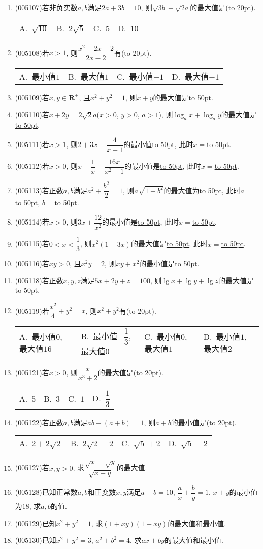 \documentclass[10pt,a4paper]{article}
\newcommand{\blank}[1]{\underline{\hbox to #1pt{}}}
\newcommand{\bracket}[1]{(\hbox to #1pt{})}
\newcommand{\fourch}[4]{\par\begin{tabular}{p{.23\textwidth}p{.23\textwidth}p{.23\textwidth}p{.23\textwidth}}
A.~#1 &B.~#2& C.~#3& D.~#4
\end{tabular}}
\begin{document}
\begin{enumerate}[1.]
\item {\tiny (005107)}若非负实数$a,b$满足$2a+3b=10$, 则$\sqrt{3b}+\sqrt{2a}$的最大值是\bracket{20}.
\fourch{$\sqrt{10}$}{$2\sqrt 5$}{$5$}{$10$}
\item {\tiny (005108)}若$x>1$, 则$\dfrac{x^2-2x+2}{2x-2}$有\bracket{20}.
\fourch{最小值$1$}{最大值$1$}{最小值$-1$}{最大值$-1$}
\item {\tiny (005109)}若$x,y\in \mathbf{R}^+$, 且$x^2+y^2=1$, 则$x+y$的最大值是\blank{50}.
\item {\tiny (005110)}若$x+2y=2\sqrt 2a$($x>0$, $y>0$, $a>1$), 则$\log_ax+\log_ay$的最大值是\blank{50}.
\item {\tiny (005111)}若$x>1$, 则$2+3x+\dfrac 4{x-1}$的最小值\blank{50}, 此时$x=$\blank{50}.
\item {\tiny (005112)}若$x>0$, 则$x+\dfrac 1x+\dfrac{16x}{x^2+1}$的最小值是\blank{50}, 此时$x=$\blank{50}.
\item {\tiny (005113)}若正数$a,b$满足$a^2+\dfrac{b^2}2=1$, 则$a\sqrt{1+b^2}$的最大值为\blank{50}, 此时$a=$\blank{50}, $b=$\blank{50}.
\item {\tiny (005114)}若$x>0$, 则$3x+\dfrac{12}{x^2}$的最小值是\blank{50}, 此时$x=$\blank{50}.
\item {\tiny (005115)}若$0<x<\dfrac 13$, 则$x^2(1-3x)$的最大值是\blank{50}, 此时$x=$\blank{50}.
\item {\tiny (005116)}若$xy>0$, 且$x^2y=2$, 则$xy+x^2$的最小值是\blank{50}.
\item {\tiny (005118)}若正数$x,y,z$满足$5x+2y+z=100$, 则$\lg x+\lg y+\lg z$的最大值是\blank{50}.
\item {\tiny (005119)}若$\dfrac{x^2}4+{y^2}=x$, 则$x^2+y^2$有\bracket{20}.
\fourch{最小值$0$, 最大值$16$}{最小值$-\dfrac 13$, 最大值$0$}{最小值$0$, 最大值$1$}{最小值$1$, 最大值$2$}
\item {\tiny (005121)}若$x>0$, 则$\dfrac x{x^3+2}$的最大值是\bracket{20}.
\fourch{$5$}{$3$}{$1$}{$\dfrac 13$}
\item {\tiny (005122)}若正数$a,b$满足$ab-(a+b)=1$, 则$a+b$的最小值是\bracket{20}.
\fourch{$2+2\sqrt 2$}{$2\sqrt 2-2$}{$\sqrt 5+2$}{$\sqrt 5-2$}
\item {\tiny (005127)}若$x,y>0$, 求$\dfrac{\sqrt x+\sqrt y}{\sqrt{x+y}}$的最大值.
\item {\tiny (005128)}已知正常数$a,b$和正变数$x,y$满足$a+b=10$, $\dfrac ax+\dfrac by=1$, $x+y$的最小值为$18$, 求$a,b$的值.
\item {\tiny (005129)}已知$x^2+y^2=1$, 求$(1+xy)(1-xy)$的最大值和最小值.
\item {\tiny (005130)}已知$x^2+y^2=3$, $a^2+b^2=4$, 求$ax+by$的最大值和最小值.

\end{enumerate}
\end{document}
